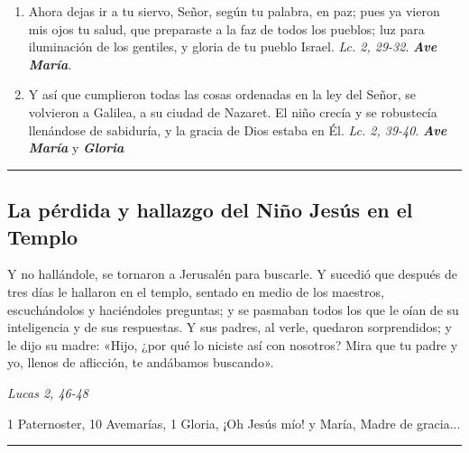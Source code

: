 \documentclass[11pt,a4paper]{book}
\begin{document}
\begin{enumerate}
        \item Ahora dejas ir a tu siervo, Señor, según tu palabra, en paz; pues ya vieron mis ojos tu salud, que preparaste a la faz de todos los pueblos; 
            luz para iluminación de los gentiles, y gloria de tu pueblo Israel. \emph{Lc. 2, 29-32}. \textbf{\emph{Ave María}}.

        \item Y así que cumplieron todas las cosas ordenadas en la ley del Señor, se volvieron a Galilea, a su ciudad de Nazaret. 
            El niño crecía y se robustecía llenándose de sabiduría, y la gracia de Dios estaba en Él. \emph{Lc. 2, 39-40}. \textbf{\emph{Ave María}} y \textbf{\emph{Gloria}}
    
    \end{enumerate}    

    \rule{\textwidth}{0.5pt}
    

    \subsection*{La pérdida y hallazgo del Niño Jesús en el Templo}

    Y no hallándole, se tornaron a Jerusalén para buscarle. Y sucedió que después de tres días le hallaron en el templo, 
    sentado en medio de los maestros, escuchándolos y haciéndoles preguntas; y se pasmaban todos los que le oían de su 
    inteligencia y de sus respuestas. Y sus padres, al verle, quedaron sorprendidos; y le dijo su madre: 
    «Hijo, ¿por qué lo niciste así con nosotros? Mira que tu padre y yo, llenos de aflicción, te andábamos buscando». 
    \begin{flushright}
        \emph{Lucas 2, 46-48}
    \end{flushright}    

    1 Paternoster, 10 Avemarías, 1 Gloria, ¡Oh Jesús mío! y María, Madre de gracia...    

    \rule{\textwidth}{0.5pt}
\end{document}
